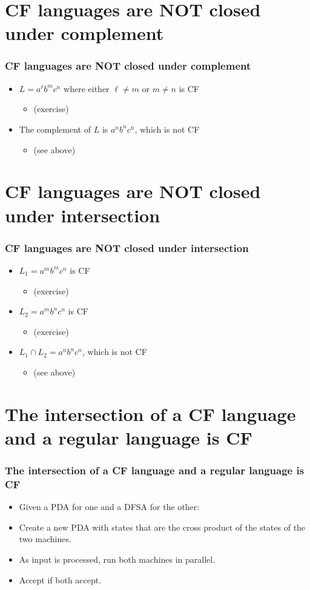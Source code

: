 \documentclass{beamer}
\newcommand{\bi}{\begin{itemize}}
\newcommand{\li}{\item}
\newcommand{\ei}{\end{itemize}}
\newcommand{\sect}[1]{
\section{#1}
\begin{frame}[fragile]\frametitle{#1}
}
\begin{document}
\sect{CF languages are NOT closed under complement}
\bi
\li $L = a^\ell b^m c^n$ where either $\ell \not = m$ or $m \not = n$ is
CF 
\bi \li (exercise) \ei
\li The complement of $L$ is $a^nb^nc^n$, which is not CF
\bi \li (see above) \ei
\ei
\end{frame}

\sect{CF languages are NOT closed under intersection}
\bi
\li $L_1 = a^mb^mc^n$ is CF 
\bi \li (exercise) \ei
\li $L_2 = a^mb^nc^n$ is CF 
\bi \li (exercise) \ei
\li $L_1 \cap L_2 = a^nb^nc^n$, which is not CF
\bi \li (see above) \ei
\ei
\end{frame}

\sect{The intersection of a CF language and a regular language is CF}
\bi
\li Given a PDA for one and a DFSA for the other:
\li Create a new PDA with states that are the cross product of the
states of the two machines.
\li As input is processed, run both machines in parallel.
\li Accept if both accept.
\ei
\end{frame}
\end{document}
